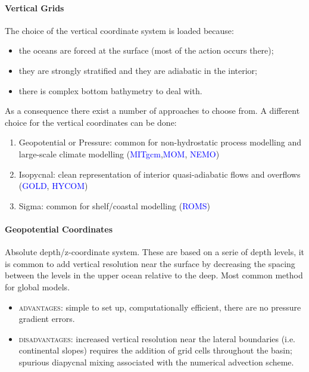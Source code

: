 \paragraph{Vertical Grids}
The choice of the vertical coordinate system is loaded because:
\begin{itemize}
    \item the oceans are forced at the surface (most of the action occurs there);
    \item they are strongly stratified and they are adiabatic in the interior;
    \item there is complex bottom bathymetry to deal with. 
\end{itemize}
As a consequence there exist a number of approaches to choose from. A different choice for the vertical coordinates can be done: 
\begin{enumerate}
\item Geopotential or Pressure: common for non-hydrostatic process modelling and large-scale climate modelling (\textcolor{Blue}{MITgcm},\textcolor{Blue}{MOM}, \textcolor{Blue}{NEMO})
    \item Isopycnal:  clean representation of interior quasi-adiabatic flows and overflows (\textcolor{Blue}{GOLD}, \textcolor{Blue}{HYCOM})
    \item Sigma: common for shelf/coastal modelling (\textcolor{Blue}{ROMS})
\end{enumerate}

\paragraph{Geopotential Coordinates} 
Absolute depth/z-coordinate system. These are based on a serie of depth levels, it is common to add vertical resolution near the surface by decreasing the spacing between the levels in the upper ocean relative to the deep. Most common method for global models.
\begin{itemize}
    \item \textsc{advantages}: simple to set up, computationally efficient, there are no pressure gradient errors.
    \item \textsc{disadvantages}: increased vertical resolution near the lateral boundaries (i.e. continental slopes) requires the addition of grid cells throughout the basin; spurious diapycnal mixing associated with the numerical advection scheme.

\end{itemize}

